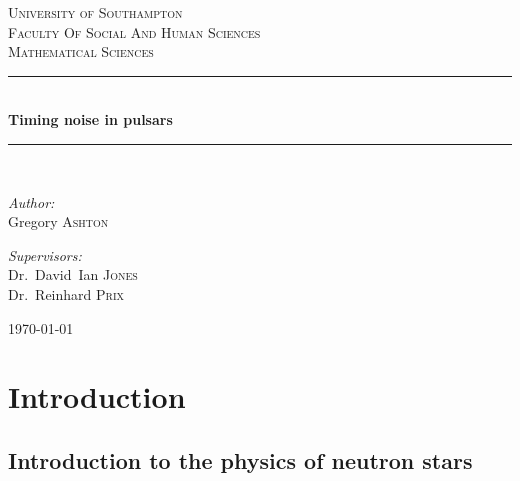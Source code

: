 \documentclass[12pt,onesided]{report}
\begin{document}
\def\biblio{}

\begin{titlepage}
\newcommand{\HRule}{\rule{\linewidth}{0.5mm}}
\begin{center}

\textsc{\LARGE University of Southampton}\\[0.2cm]
\textsc{\Large Faculty Of Social And Human Sciences}\\[0.2cm]
\textsc{\Large Mathematical Sciences}\\[1.5cm]

\HRule \\[0.4cm]
{ \huge \bfseries Timing noise in pulsars \\[0.4cm] }

\HRule \\[1.5cm]

\noindent
\begin{minipage}{0.4\textwidth}
\begin{flushleft} \large
\emph{Author:}\\
Gregory \textsc{Ashton}
\end{flushleft}
\end{minipage}%
\begin{minipage}{0.4\textwidth}
\begin{flushright} \large
\emph{Supervisors:} \\
Dr.~David~Ian \textsc{Jones} \\
Dr.~Reinhard \textsc{Prix}
\end{flushright}
\end{minipage}

\vfill

{\large \today}
\end{center}
\end{titlepage}

\tableofcontents


\part{Introduction }


\chapter{Introduction to the physics of neutron stars}
\label{sec: neutron star physics}




\end{document}
